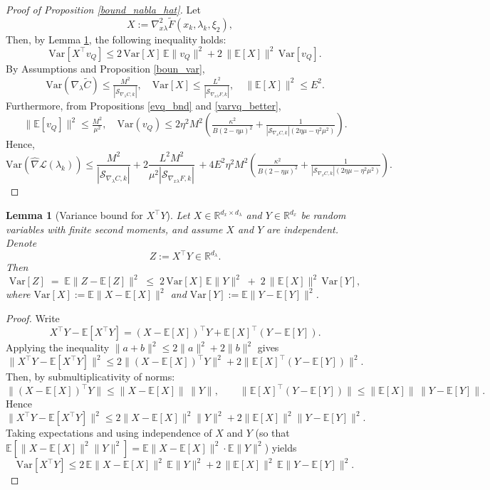 \documentclass[11pt, twoside]{report}
\newtheorem{lemma}[theorem]{Lemma}
\begin{document}
\begin{proof}[Proof of Proposition \ref{bound_nabla_hat}]
Let 
\[
X := \nabla_{x \lambda}^2 \tilde{F}(x_k,\lambda_k,\xi_2), \quad 
\]
Then, by Lemma \ref{var_lemma_appendix}, the following inequality holds:
\[
\mathrm{Var}[X^\top v_Q]
\leq 2 \, \mathrm{Var}[X] \, \mathbb{E}\|v_Q\|^2 
+ 2 \, \|\mathbb{E}[X]\|^2 \, \mathrm{Var}[v_Q].
\]
By Assumptions and Proposition \ref{boun_var},
\[
\mathrm{Var}(\nabla_\lambda \tilde{C}) \leq \tfrac{M^2}{|\mathcal{S}_{\nabla_\lambda C,k}|}, 
\quad \mathrm{Var}[X] \leq \tfrac{L^2}{|\mathcal{S}_{\nabla_{x\lambda} F,k}|}, 
\quad \|\mathbb{E}[X]\|^2 \leq E^2.
\]
Furthermore, from Propositions \ref{evq_bnd} and \ref{varvq_better},
\[
\|\mathbb{E}[v_Q]\|^2 \leq \tfrac{M^2}{\mu^2}, 
\quad \mathrm{Var}(v_Q) \leq 2\eta^2 M^2 \left( \tfrac{\kappa^2}{B (2 - \eta \mu)^2} 
+ \tfrac{1}{|\mathcal{S}_{\nabla_x C,k}|(2\eta \mu - \eta^2 \mu^2)} \right).
\]
Hence,
\[
\mathrm{Var}(\widehat{\nabla}\mathcal{L}(\lambda_k)) 
\leq \frac{M^2}{|\mathcal{S}_{\nabla_\lambda C,k}|} 
+ 2 \frac{L^2 M^2}{\mu^2|\mathcal{S}_{\nabla_{x\lambda} F,k}|} \, 
+ 4E^2\eta^2 M^2 \left( \tfrac{\kappa^2}{B (2 - \eta \mu)^2} 
+ \tfrac{1}{|\mathcal{S}_{\nabla_x C,k}|(2\eta \mu - \eta^2 \mu^2)} \right).
\]
\end{proof}


\begin{lemma}[Variance bound for $X^\top Y$] \label{var_lemma_appendix}
\label{lem:var_XtY}
Let \(X\in\mathbb{R}^{d_x\times d_\lambda}\) and \(Y\in\mathbb{R}^{d_x}\) be random variables with finite second moments, and assume \(X\) and \(Y\) are independent. Denote
\[
Z := X^\top Y \in \mathbb{R}^{d_\lambda}.
\]
Then
\[
\mathrm{Var}[Z] \;=\; \mathbb{E}\big\|Z - \mathbb{E}[Z]\big\|^2
\;\le\; 2\,\mathrm{Var}[X] \,\mathbb{E}\|Y\|^2
\;+\; 2\,\big\|\mathbb{E}[X]\big\|^2 \,\mathrm{Var}[Y],
\]
where \(\mathrm{Var}[X]:=\mathbb{E}\|X-\mathbb{E}[X]\|^2\) and \(\mathrm{Var}[Y]:=\mathbb{E}\|Y-\mathbb{E}[Y]\|^2\).
\end{lemma}

\begin{proof}
Write
\[
X^\top Y - \mathbb{E}[X^\top Y] = (X - \mathbb{E}[X])^\top Y + \mathbb{E}[X]^\top (Y - \mathbb{E}[Y]).
\]
Applying the inequality \(\|a+b\|^2 \le 2\|a\|^2 + 2\|b\|^2\) gives
\[
\|X^\top Y - \mathbb{E}[X^\top Y]\|^2
\le 2\|(X-\mathbb{E}[X])^\top Y\|^2 + 2\|\mathbb{E}[X]^\top (Y-\mathbb{E}[Y])\|^2.
\]
Then, by submultiplicativity of norms:
\[
\|(X-\mathbb{E}[X])^\top Y\| \le \|X-\mathbb{E}[X]\|\,\|Y\|, \qquad
\|\mathbb{E}[X]^\top (Y-\mathbb{E}[Y])\| \le \|\mathbb{E}[X]\|\,\|Y-\mathbb{E}[Y]\|.
\]
Hence
\[
\|X^\top Y - \mathbb{E}[X^\top Y]\|^2
\le 2 \|X-\mathbb{E}[X]\|^2 \|Y\|^2 + 2 \|\mathbb{E}[X]\|^2 \|Y-\mathbb{E}[Y]\|^2.
\]
Taking expectations and using independence of \(X\) and \(Y\) (so that \(\mathbb{E}[\|X-\mathbb{E}[X]\|^2\|Y\|^2] = \mathbb{E}\|X-\mathbb{E}[X]\|^2 \cdot \mathbb{E}\|Y\|^2\)) yields
\[
\mathrm{Var}[X^\top Y]
\le 2\,\mathbb{E}\|X-\mathbb{E}[X]\|^2 \,\mathbb{E}\|Y\|^2
+ 2\,\|\mathbb{E}[X]\|^2 \,\mathbb{E}\|Y-\mathbb{E}[Y]\|^2.
\]
\end{proof}
\end{document}
